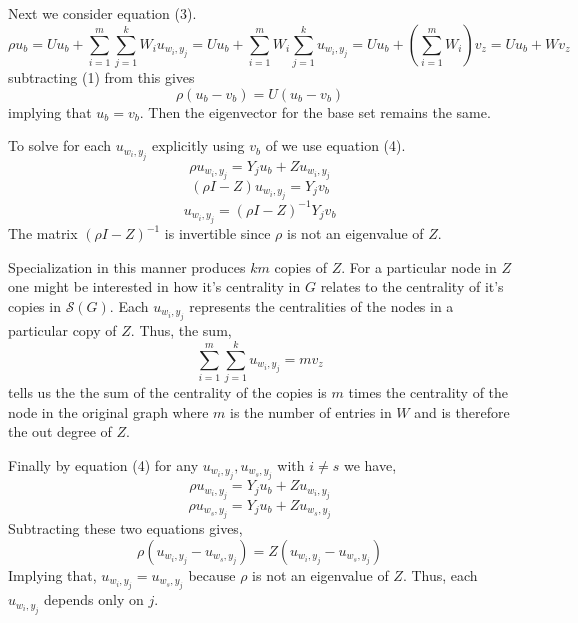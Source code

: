 \documentclass{article}
\begin{document}
Next we consider equation (3).
\[
\rho u_b 
= Uu_b +\sum_{i=1}^{m}\sum_{j=1}^{k}W_iu_{w_i,y_j}
= Uu_b +\sum_{i=1}^{m}W_i\sum_{j=1}^{k}u_{w_i,y_j}
= Uu_b +(\sum_{i=1}^{m}W_i)v_z
= Uu_b + Wv_z
\]
subtracting (1) from this gives
\[
\rho (u_b-v_b) = U(u_b-v_b)
\]
implying that $u_b = v_b$. Then the eigenvector for the base set remains the same.

To solve for each $u_{w_i,y_j}$ explicitly using $v_b$ of  we use equation (4).
\[
\rho u_{w_i,y_j} = Y_ju_b +Zu_{w_i,y_j}
\]
\[
(\rho I - Z)u_{w_i,y_j} = Y_jv_b 
\]
\[
u_{w_i,y_j} =(\rho I - Z)^{-1} Y_jv_b 
\]
The matrix $(\rho I - Z)^{-1}$ is invertible since $\rho$ is not an eigenvalue of $Z$.

Specialization in this manner produces $km$ copies of $Z$. For a particular node in $Z$ one might be interested in how it's centrality in $G$ relates to the centrality of it's copies in $\mathcal{S}(G)$. Each $u_{w_i,y_j}$ represents the centralities of the nodes in a particular copy of $Z$. Thus, the sum, 
\[
\sum_{i=1}^{m}\sum_{j=1}^{k}u_{w_i,y_j} = mv_z
\]
tells us the the sum of the centrality of the copies is $m$ times the centrality of the node in the original graph where $m$ is the number of entries in $W$ and is therefore  the out degree of $Z$.

Finally by equation (4) for any $u_{w_i,y_j}, u_{w_s,y_j}$ with $i \neq s$ we have,
\[
\rho u_{w_i,y_j} = Y_ju_b +Zu_{w_i,y_j}
\]
\[
\rho u_{w_s,y_j} = Y_ju_b +Zu_{w_s,y_j}
\]
Subtracting these two equations gives,
\[
\rho (u_{w_i,y_j} - u_{w_s,y_j}) = Z(u_{w_i,y_j}-u_{w_s,y_j})
\]
Implying that,
$u_{w_i,y_j} = u_{w_s,y_j}$
because $\rho$ is not an eigenvalue of $Z$. Thus, each $u_{w_i,y_j}$ depends only on $j$.
\end{document}
